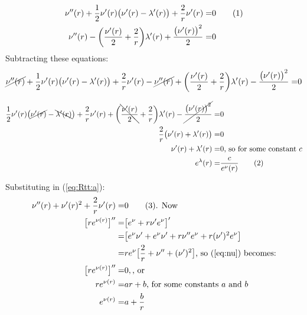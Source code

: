\documentclass[]{article}
\newcommand\numberthis{\addtocounter{equation}{1}\tag{\theequation}}
\begin{document}
\begin{align*}
	\nu^{\prime\prime}(r) + \frac{1}{2}\nu^\prime(r) \big(\nu^\prime(r)-\lambda^\prime(r)\big)+ \frac{2}{r}\nu^\prime(r)=&0 \numberthis \label{eq:Rtt:a}\\
	\nu^{\prime\prime}(r) - \bigg(\frac{\nu^\prime(r)}{2}  + \frac{2}{r}  \bigg) \lambda^\prime(r) + \frac{\big(\nu^\prime(r)\big)^2}{2}=&0\\
\end{align*}
Subtracting these equations:
\begin{align*}
	\cancel{\nu^{\prime\prime}(r)} + \frac{1}{2}\nu^\prime(r) \big(\nu^\prime(r)-\lambda^\prime(r)\big)+ \frac{2}{r}\nu^\prime(r)-\cancel{\nu^{\prime\prime}(r)} + \bigg(\frac{\nu^\prime(r)}{2}  + \frac{2}{r}  \bigg) \lambda^\prime(r) - \frac{\big(\nu^\prime(r)\big)^2}{2}=&0\\
\end{align*}

\begin{align*}
	 \frac{1}{2}\nu^\prime(r) \big(\cancel{\nu^\prime(r)}-\bcancel{\lambda^\prime(r)}\big)+ \frac{2}{r}\nu^\prime(r) + \bigg(\bcancel{\frac{\nu^\prime(r)}{2}}  + \frac{2}{r}  \bigg) \lambda^\prime(r) - \cancel{\frac{\big(\nu^\prime(r)\big)^2}{2}}=&0\\
	 \frac{2}{r}\big(\nu^\prime(r)+\lambda^\prime(r)\big)=&0\\
	 \nu^\prime(r)+\lambda^\prime(r)=&0 \text{, so for some constant $c$}\\
	 e^\lambda(r) =& \frac{c}{e^\nu(r)}  \numberthis \label{eq:lambda:nu}
\end{align*}

Substituting in (\ref{eq:Rtt:a}):
\begin{align*}
	\nu^{\prime\prime}(r) + \nu^\prime(r)^2 + \frac{2}{r}\nu^\prime(r)=&0 \numberthis \label{eq:nu} \text{. Now}\\
	\big[r e^{\nu(r)}\big]^{\prime\prime}=& \big[e^\nu+r \nu^\prime e^\nu\big]^\prime\\
	=& \big[e^\nu \nu^\prime + e^\nu \nu^\prime + r \nu^{\prime\prime} e^\nu + r (\nu^\prime)^2 e^\nu\big]\\
	=& r e^\nu\big[\frac{2}{r} + \nu^{\prime\prime} + (\nu^\prime)^2\big] \text{, so (\ref{eq:nu}) becomes:}\\
	\big[r e^{\nu(r)}\big]^{\prime\prime}=&0, \text{, or}\\
	r e^{\nu(r)} =&ar + b	\text{, for some constants $a$ and $b$}\\
	e^{\nu(r)} =&a + \frac{b}{r}
\end{align*}
\end{document}
